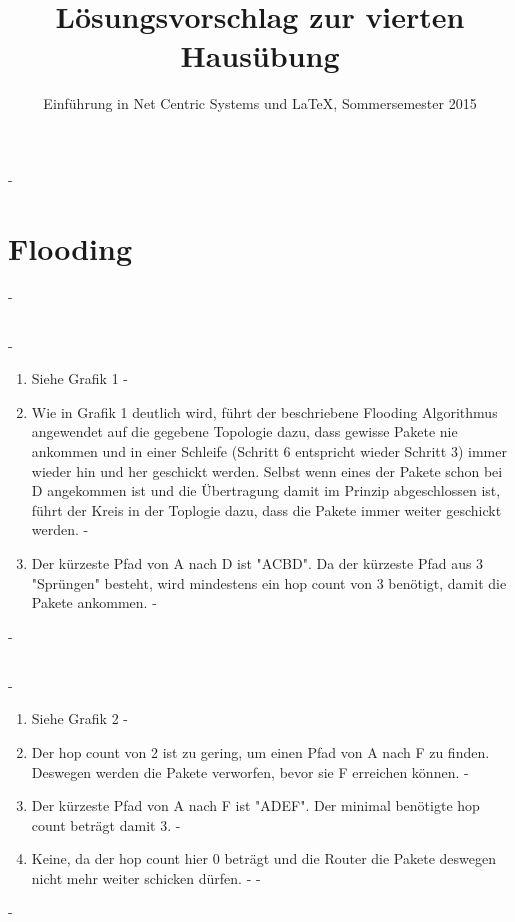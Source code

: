 \documentclass[a4paper,
			llpt,
			solution,
			accentcolor=tud2d,
			colorbacktitle
			]
			{tudexercise}
\title{Lösungsvorschlag zur vierten Hausübung}
\subtitle{Einführung in Net Centric Systems und \LaTeX, Sommersemester 2015}
\newcommand{\8}{$\infty$}
\begin{document}
\maketitle
-\section{Flooding}
-\subsection{}
-\begin{enumerate}
-\item Siehe Grafik 1
-\item Wie in Grafik 1 deutlich wird, führt der beschriebene Flooding Algorithmus angewendet auf die gegebene Topologie dazu, dass gewisse Pakete nie ankommen und in einer Schleife (Schritt 6 entspricht wieder Schritt 3) immer wieder hin und her geschickt werden. Selbst wenn eines der Pakete schon bei D angekommen ist und die Übertragung damit im Prinzip abgeschlossen ist, führt der Kreis in der Toplogie dazu, dass die Pakete immer weiter geschickt werden.
-\item Der kürzeste Pfad von A nach D ist "ACBD". Da der kürzeste Pfad aus 3 "Sprüngen" besteht, wird mindestens ein hop count von 3 benötigt, damit die Pakete ankommen.
-\end{enumerate}
-\subsection{}
-\begin{enumerate}
-
-\item Siehe Grafik 2
-\item Der hop count von 2 ist zu gering, um einen Pfad von A nach F zu finden. Deswegen werden die Pakete verworfen, bevor sie F erreichen können.
-\item Der kürzeste Pfad von A nach F ist "ADEF". Der minimal benötigte hop count beträgt damit 3.
-\item Keine, da der hop count hier 0 beträgt und die Router die Pakete deswegen nicht mehr weiter schicken dürfen.
-
-\end{enumerate}
-\subsection{}
\end{document}
